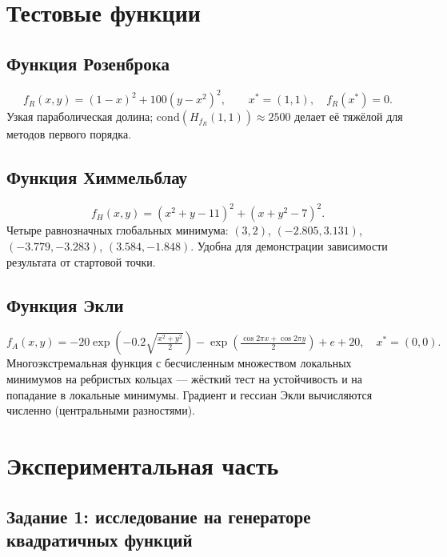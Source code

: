 \documentclass[a4paper,12pt]{article}
\theoremstyle{definition}
\begin{document}
\section{Тестовые функции}

\subsection{Функция Розенброка}
\[
    f_R(x, y) = (1 - x)^2 + 100(y - x^2)^2, \qquad x^* = (1, 1), \quad f_R(x^*) = 0.
\]
Узкая параболическая долина; $\mathrm{cond}(H_{f_R}(1,1)) \approx 2500$ делает её
тяжёлой для методов первого порядка.

\subsection{Функция Химмельблау}
\[
    f_H(x, y) = (x^2 + y - 11)^2 + (x + y^2 - 7)^2.
\]
Четыре равнозначных глобальных минимума: $(3,2)$, $(-2.805, 3.131)$, $(-3.779, -3.283)$,
$(3.584, -1.848)$. Удобна для демонстрации зависимости результата от стартовой точки.

\subsection{Функция Экли}
\[
    f_A(x,y) = -20\exp\!\left(-0.2\sqrt{\tfrac{x^2+y^2}{2}}\right)
    -\exp\!\left(\tfrac{\cos 2\pi x + \cos 2\pi y}{2}\right) + e + 20, \quad x^* = (0,0).
\]
Многоэкстремальная функция с бесчисленным множеством локальных минимумов на ребристых кольцах —
жёсткий тест на устойчивость и на попадание в локальные минимумы. Градиент и гессиан Экли
вычисляются численно (центральными разностями).

\section{Экспериментальная часть}

\subsection{Задание 1: исследование на генераторе квадратичных функций}
\end{document}

